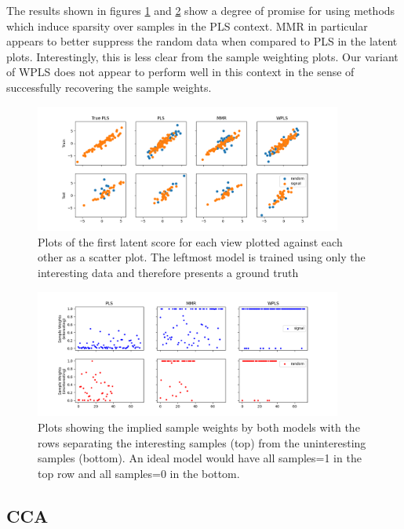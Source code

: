 The results shown in figures \ref{fig:plslatent} and \ref{fig:plsweights} show a degree of promise for using methods which induce sparsity over samples in the PLS context. MMR in particular appears to better suppress the random data when compared to PLS in the latent plots. Interestingly, this is less clear from the sample weighting plots. Our variant of WPLS does not appear to perform well in this context in the sense of successfully recovering the sample weights.

\begin{figure}[H] 
    \centering
    \includegraphics[width=0.9\textwidth]{chapters/sampleselection/pls/models.png}
    \caption{Plots of the first latent score for each view plotted against each other as a scatter plot. The leftmost model is trained using only the interesting data and therefore presents a ground truth}
    \label{fig:plslatent}
\end{figure}

\begin{figure}[H] 
    \centering
    \includegraphics[width=0.9\textwidth]{chapters/sampleselection/pls/weights.png}
    \caption{Plots showing the implied sample weights by both models with the rows separating the interesting samples (top) from the uninteresting samples (bottom). An ideal model would have all samples=1 in the top row and all samples=0 in the bottom.}
    \label{fig:plsweights}
\end{figure}

\subsection{CCA}

